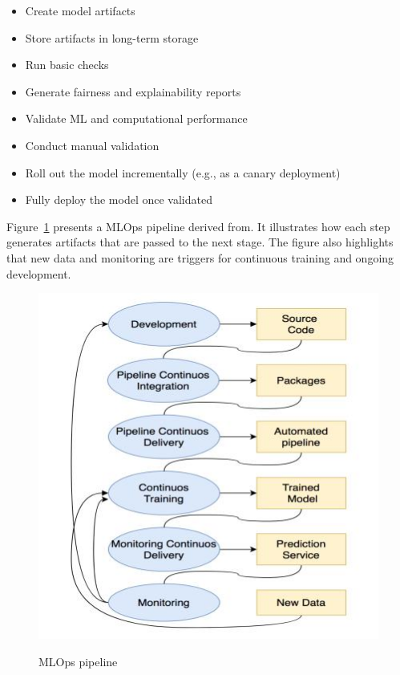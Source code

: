 \begin{itemize}
    \item Create model artifacts
    \item Store artifacts in long-term storage
    \item Run basic checks
    \item Generate fairness and explainability reports
\end{itemize}
\begin{itemize}
    \item Validate ML and computational performance
    \item Conduct manual validation
\end{itemize}
\begin{itemize}
    \item Roll out the model incrementally (e.g., as a canary deployment)
    \item Fully deploy the model once validated
\end{itemize}

Figure~\ref{fig:mlops-pipeline} presents a MLOps pipeline derived from\cite{inproceedings}.
It illustrates how each step generates artifacts that are passed to the next stage.
The figure also highlights that new data and monitoring are triggers for continuous training and ongoing development.

\begin{figure}[!htbp]
    \caption{MLOps pipeline\cite{inproceedings}}
    \centering
    \includegraphics[scale=0.5]{images/mlops-pipeline}
    \label{fig:mlops-pipeline}
\end{figure}

